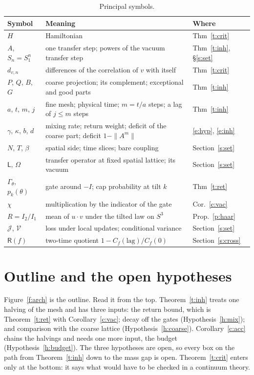 \begin{table}[ht]
\centering\small
\begin{tabular}{@{}lll@{}}
\toprule
Symbol & Meaning & Where \\
\midrule
$H$ & Hamiltonian & Thm~\ref{t:crit} \\
$A$, $S_n=S_1^n$ & one transfer step; powers of the vacuum transfer step & Thm~\ref{t:inh}, \S\ref{s:set} \\
$d_{v,n}$ & differences of the correlation of $v$ with itself & Thm~\ref{t:crit} \\
$P$, $Q$, $B$, $G$ & coarse projection; its complement; exceptional and good parts & Thm~\ref{t:inh} \\
$a$, $t$, $m$, $j$ & fine mesh; physical time; $m=t/a$ steps; a lag of $j\le m$ steps & Thm~\ref{t:inh} \\
$\gamma$, $\kappa$, $b$, $d$ & mixing rate; return weight; deficit of the coarse part; deficit $1-\|A^m\|$ & \eqref{e:hyp}, \eqref{e:inh} \\
$N$, $T$, $\beta$ & spatial side; time slices; bare coupling & Section~\ref{s:set} \\
$\mathsf L$, $\Omega$ & transfer operator at fixed spatial lattice; its vacuum & Section~\ref{s:set} \\
$\Gamma_\theta$, $p_k(\theta)$ & gate around $-I$; cap probability at tilt $k$ & Thm~\ref{t:ret} \\
$\chi$ & multiplication by the indicator of the gate & Cor.~\ref{c:vac} \\
$R=I_2/I_1$ & mean of $u\cdot v$ under the tilted law on $S^3$ & Prop.~\ref{p:haar} \\
$\mathcal J$, $\mathcal V$ & loss under local updates; conditional variance & Section~\ref{s:set} \\
$\mathsf R(f)$ & two-time quotient $1-C_f(\text{lag})/C_f(0)$ & Section~\ref{s:cross} \\
\bottomrule
\end{tabular}
\caption{Principal symbols.}\label{tab:sym}
\end{table}

\section{Outline and the open hypotheses}\label{s:arch}
Figure~\ref{f:arch} is the outline. Read it from the top. Theorem~\ref{t:inh} treats one halving of the mesh and
has three inputs: the return bound, which is Theorem~\ref{t:ret} with Corollary~\ref{c:vac}; decay off the
gates (Hypothesis~\ref{h:mix}); and comparison with the coarse lattice (Hypothesis~\ref{h:coarse}).
Corollary~\ref{c:acc} chains the halvings and needs one more input, the budget (Hypothesis~\ref{h:budget}). The
three hypotheses are open, so every box on the path from Theorem~\ref{t:inh} down to the mass gap is open.
Theorem~\ref{t:crit} enters only at the bottom: it says what would have to be checked in a continuum theory.

